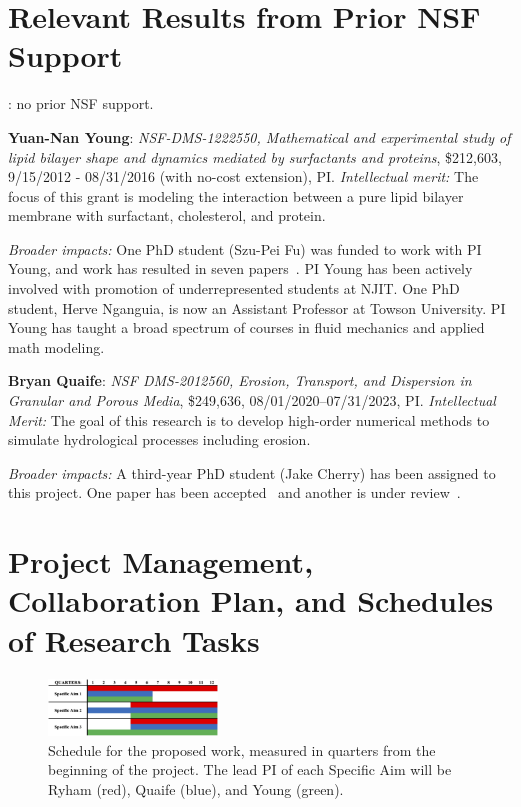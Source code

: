 \section{Relevant Results from Prior NSF Support}
: no prior NSF support.

\noindent
{\bf Yuan-Nan Young}: {\em NSF-DMS-1222550, Mathematical and
experimental study of lipid bilayer shape and dynamics mediated by
surfactants and proteins}, \$212,603, 9/15/2012 - 08/31/2016 (with
no-cost extension), PI. {\em Intellectual merit:} The focus of this
grant is modeling the interaction between a pure lipid bilayer membrane
with surfactant, cholesterol, and protein.

\noindent
{\it Broader impacts:} 
One PhD student (Szu-Pei Fu) was funded to work with PI Young, and work
has resulted in seven papers~\cite{Nganguia2013_PoF, Nganguia2013_PRE,
Young2014_JFM, Young2015_PoF, Nganguia2015_CiCP, Pak2015_PNAS,
fu2015pre}. PI Young has been actively involved with promotion of
underrepresented students at NJIT. One PhD student, Herve Nganguia, is
now an Assistant Professor at Towson University. PI Young has taught a
broad spectrum of courses in fluid mechanics and applied math modeling.

\noindent
{\bf Bryan Quaife}: {\em NSF DMS-2012560, Erosion, Transport, and
Dispersion in Granular and Porous Media}, \$249,636,
08/01/2020--07/31/2023, PI. {\em Intellectual Merit:} The goal of this
research is to develop high-order numerical methods to
simulate hydrological processes including erosion.

\noindent
{\it Broader impacts:} 
A third-year PhD student (Jake Cherry) has been assigned to this
project. One paper has been accepted~\cite{che-lin-her-qua2022} and
another is under review~\cite{moo-che-chi-qua2022}.

\section{Project Management, Collaboration Plan, and Schedules of
Research Tasks}
\setlength{\parindent}{0pt}

\begin{figure}
  \includegraphics[width=0.4\textwidth]{figures/gantt.jpg}
  \caption{\label{fig:schedule} Schedule for the proposed work, measured
  in quarters from the beginning of the project. The lead PI of each
  Specific Aim will be Ryham (red), Quaife (blue), and Young (green).}
\end{figure}


